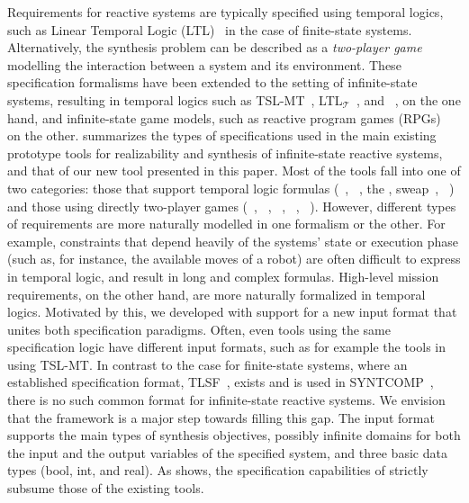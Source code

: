 Requirements for reactive systems are typically specified using temporal logics,  such as Linear Temporal Logic (LTL)~\cite{Pnueli77} in the case of finite-state systems. 
 Alternatively,  the synthesis problem can be described as a \emph{two-player game} modelling the interaction between a system and its environment.  These specification formalisms have been extended to the setting of infinite-state systems, resulting in temporal logics such as TSL-MT~\cite{FinkbeinerHP22}, LTL$_\mathcal T$~\cite{RodriguezS23}, and \rpltl~\cite{HeimD25},  on the one hand,  and infinite-state game models, such as reactive program games (RPGs)~\cite{HeimD24} on the other.
 summarizes the types of specifications used in the main existing  prototype tools for realizability and synthesis of infinite-state reactive systems,  and that of our new tool \issy presented in this paper.
Most of the tools fall into one of two categories: those that support temporal logic formulas (\temos~\cite{ChoiFPS22},  \raboniel~\cite{MaderbacherB22}, the \cesars, sweap~\cite{AzzopardiPSS24}, \tslmtrpg~\cite{HeimD25}) and those using directly two-player games
(\gensys~\cite{SamuelDK21}, \gensysltl~\cite{SamuelDK23}, \simsynth~\cite{FarzanK18},  \rpgsolve~\cite{HeimD24},  \rpgstela~\cite{SchmuckHDN24}).
However, different types of requirements are more naturally modelled in one formalism or the other. 
For example,  constraints that depend heavily of the systems' state or execution phase (such as, for instance, the available moves of a robot) are often difficult to express in temporal logic, and result in long and complex formulas.  High-level mission requirements, on the other hand,  are more naturally formalized in temporal logics.  Motivated by this, we developed \issy with support for a new input format that unites both specification paradigms.  
Often, even tools using the same specification logic have different input formats, such as for example the tools in  using TSL-MT. 
In contrast to the case for finite-state systems, where an established specification format, TLSF~\cite{JacobsPS23},  exists and is used in SYNTCOMP~\cite{syntcomp},  there is no such common format for  infinite-state reactive systems. 
We envision that the \issy framework is a major step towards filling this gap.
The \issy input format  supports the main types of synthesis objectives,  possibly infinite domains for both the input and the output variables of the specified system,  and three basic data types (bool, int, and real).  As  shows,  the specification capabilities of \issy strictly subsume those of the  existing tools.

